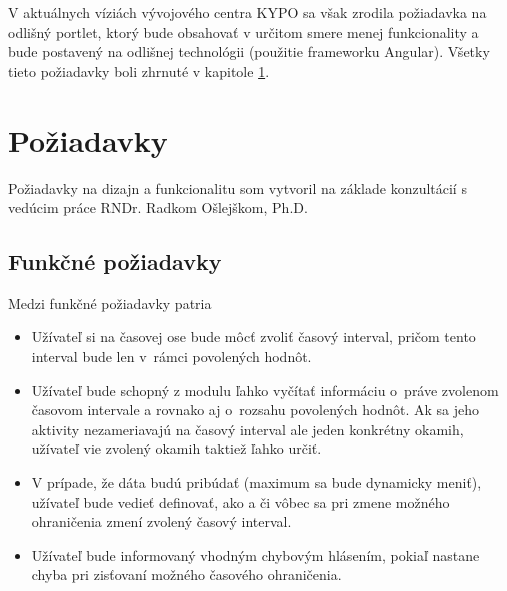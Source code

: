 \documentclass[
  digital, %
  twoside, %
  notable,   %
  nolof,   %
  nolot,   %
]{fithesis3}
\begin{document}
V aktuálnych víziách vývojového centra KYPO sa však zrodila požiadavka na odlišný portlet, ktorý bude obsahovať v určitom smere menej funkcionality a bude postavený na odlišnej technológii (použitie frameworku Angular). Všetky tieto požiadavky boli zhrnuté v kapitole \ref{requirements}.

\clearpage

\section{Požiadavky}
\label{requirements}
Požiadavky na dizajn a funkcionalitu som vytvoril na základe konzultácií s vedúcim práce RNDr. Radkom Ošlejškom, Ph.D.

\subsection{Funkčné požiadavky}
\label{funkcne_poziadavky}
Medzi funkčné požiadavky patria
\begin{itemize}
\item Užívateľ si na časovej ose bude môcť zvoliť časový interval, pričom tento interval bude len v~rámci povolených hodnôt.
\item Užívateľ bude schopný z modulu ľahko vyčítať informáciu o~práve zvolenom časovom intervale a rovnako aj o~rozsahu povolených hodnôt. Ak sa jeho aktivity nezameriavajú na časový interval ale jeden konkrétny okamih, užívateľ vie zvolený okamih taktiež ľahko určiť.
\item V prípade, že dáta budú pribúdať (maximum sa bude dynamicky meniť), užívateľ bude vedieť definovať, ako a či vôbec sa pri zmene možného ohraničenia zmení zvolený časový interval.
\item Užívateľ bude informovaný vhodným chybovým hlásením, pokiaľ nastane chyba pri zisťovaní možného časového ohraničenia.
\end{itemize}
\end{document}
